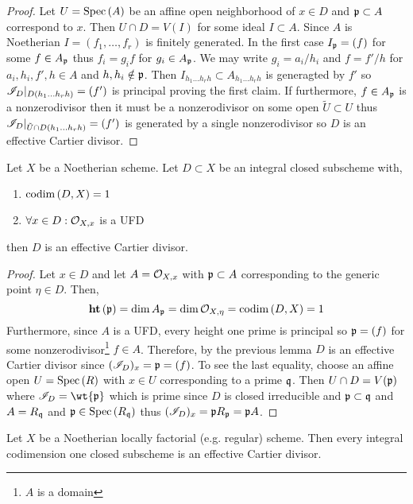 \documentclass[12pt]{article}
\begin{document}
\begin{proof}
Let $U = \mathrm{Spec}\left( A \right)$ be an affine open neighborhood of $x \in D$ and $\mathfrak{p} \subset A$ correspond to $x$. Then $U \cap D = V(I)$ for some ideal $I \subset A$. Since $A$ is Noetherian $I = (f_1, \dots, f_r)$ is finitely generated. In the first case $I_{\mathfrak{p}} = (f)$ for some $f \in A_{\mathfrak{p}}$ thus $f_i = g_i f$ for $g_i \in A_{\mathfrak{p}}$. We may write $g_i = a_i / h_i$ and $f = f' / h$ for $a_i, h_i, f', h \in A$ and $h, h_i \notin \mathfrak{p}$. Then $I_{h_1 \dots h_r h} \subset A_{h_1 \dots h_r h}$ is generagted by $f'$ so $\mathscr{I}_D |_{D(h_1 \dots h_r h)} = (f')$ is principal proving the first claim. If furthermore, $f \in A_{\mathfrak{p}}$ is a nonzerodivisor then it must be a nonzerodivisor on some open $\tilde{U} \subset U$ thus $\mathscr{I}_{D}|_{\tilde{U} \cap D(h_1 \dots h_r h)} = (f')$ is generated by a single nonzerodivisor so $D$ is an effective Cartier divisor.
\end{proof}

\begin{lemma}
Let $X$ be a Noetherian scheme. Let $D \subset X$ be an integral closed subscheme with,
\begin{enumerate}
\item $\mathrm{codim}\left( D,X \right) = 1$
\item $\forall x \in D : \mathcal{O}_{X, x}$ is a UFD
\end{enumerate}
then $D$ is an effective Cartier divisor.
\end{lemma}

\begin{proof}
Let $x \in D$ and let $A = \mathcal{O}_{X, x}$ with $\mathfrak{p} \subset A$ corresponding to the generic point $\eta \in D$. Then,
\[ \mathbf{ht}\left( \mathfrak{p} \right) = \dim{A_{\mathfrak{p}}} = \dim{\mathcal{O}_{X, \eta}} = \mathrm{codim}\left( D, X \right) = 1 \]
Furthermore, since $A$ is a UFD, every height one prime is principal so $\mathfrak{p} = (f)$ for some nonzerodivisor\footnote{$A$ is a domain} $f \in A$. Therefore, by the previous lemma $D$ is an effective Cartier divisor since $(\mathscr{I}_D)_x = \mathfrak{p} = (f)$. To see the last equality, choose an affine open $U = \mathrm{Spec}\left( R \right)$ with $x \in U$ corresponding to a prime $\mathfrak{q}$. Then $U \cap D = V(\mathfrak{p})$ where $\I_D = \wt{\p}$ which is prime since $D$ is closed irreducible and $\mathfrak{p} \subset \mathfrak{q}$ and $A = R_{\mathfrak{q}}$ and $\mathfrak{p} \in \mathrm{Spec}\left( R_{\mathfrak{q}} \right)$ thus $(\mathscr{I}_D)_x = \mathfrak{p} R_{\mathfrak{p}} = \mathfrak{p} A$.
\end{proof}

\begin{cor}
Let $X$ be a Noetherian locally factorial (e.g. regular) scheme. Then every integral codimension one closed subscheme is an effective Cartier divisor.
\end{cor}
\end{document}
